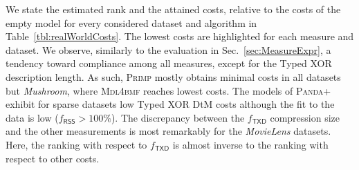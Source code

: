 We state the estimated rank and the attained costs, relative to the costs of the empty model for every considered dataset and algorithm in Table~\ref{tbl:realWorldCosts}. The lowest costs are highlighted for each measure and dataset. We observe, similarly to the evaluation in Sec.~\ref{sec:MeasureExpr}, a tendency toward compliance among all measures, except for the Typed XOR description length. 
As such, \textsc{Primp} mostly obtains minimal costs in all datasets but \textit{Mushroom}, where \textsc{Mdl4bmf} reaches lowest costs.   The models of \textsc{Panda+} exhibit for sparse datasets low Typed XOR DtM costs although the fit to the data is low ($f_\mathsf{RSS}>100\%$). The discrepancy between the $f_\mathsf{TXD}$ compression size and the other measurements is most remarkably for the \textit{MovieLens} datasets. Here, the ranking with respect to $f_\mathsf{TXD}$ is  almost inverse to the ranking with respect to other costs.
